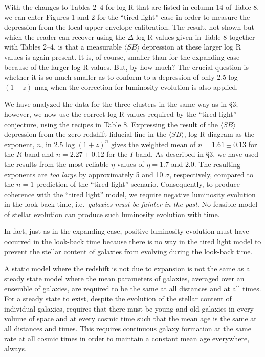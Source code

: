 \documentclass[preprint]{aastex}
\begin{document}
With the changes to Tables 2--4 for log R that are listed in column 14
of Table 8, we can enter Figures 1 and 2 for the ``tired light'' case
in order to measure the depression from the local upper envelope
calibration. The result, not shown but which the reader can recover
using the $\Delta$ log R values given in Table 8 together with Tables
2--4, is that a measurable $\langle SB \rangle$ depression at these
larger log R values is again present. It is, of course, smaller than
for the expanding case because of the larger log R values. But, by how
much?  The crucial question is whether it is so much smaller as to
conform to a depression of only 2.5 log $(1 + z)$ mag when the
correction for luminosity evolution is also applied.

We have analyzed the data for the three clusters in the same way as in
\S 3; however, we now use the correct log R values required by the
``tired light'' conjecture, using the recipes in Table 8. Expressing
the result of the $\langle SB \rangle$ depression from the
zero-redshift fiducial line in the $\langle SB \rangle$, log R diagram
as the exponent, $n$, in 2.5 log $(1 + z)^n$ gives the weighted mean
of $n = 1.61 \pm 0.13$ for the $R$ band and $n = 2.27 \pm 0.12$ for
the $I$ band. As described in \S3, we have used the results from the
most reliable $\eta$ values of $\eta = 1.7$ and $2.0$. The resulting
exponents are {\it too large} by approximately 5 and 10 $\sigma$,
respectively, compared to the $n=1$ prediction of the ``tired light''
scenario. Consequently, to produce coherence with the ``tired light''
model, we require negative luminosity evolution in the look-back time,
i.e.\ {\it galaxies must be fainter in the past}. No feasible model of
stellar evolution can produce such luminosity evolution with time.

In fact, just as in the expanding case, positive luminosity evolution
must have occurred in the look-back time because there is no way in
the tired light model to prevent the stellar content of galaxies from
evolving during the look-back time.

A static model where the redshift is not due to expansion is not the
same as a steady state model where the mean parameters of galaxies,
averaged over an ensemble of galaxies, are required to be the same at
all distances and at all times. For a steady state to exist, despite
the evolution of the stellar content of individual galaxies, requires
that there must be young and old galaxies in every volume of space and
at every cosmic time such that the mean age is the same at all
distances and times. This requires continuous galaxy formation at the
same rate at all cosmic times in order to maintain a constant mean age
everywhere, always.
\end{document}
